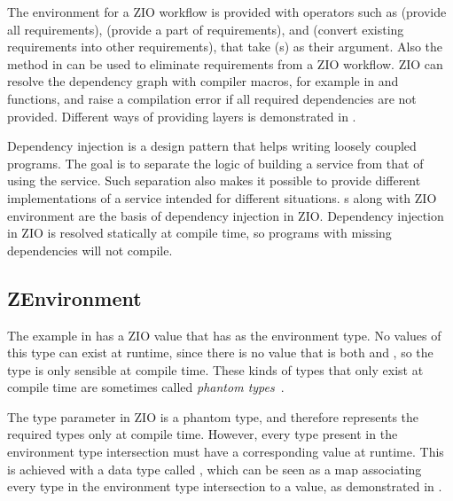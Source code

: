 

The environment for a ZIO workflow is provided with operators such as  (provide all requirements),  (provide a part of requirements), and  (convert existing requirements into other requirements), that take (s) as their argument. Also the  method in  can be used to eliminate requirements from a ZIO workflow. ZIO can resolve the dependency graph with compiler macros, for example in  and  functions, and raise a compilation error if all required dependencies are not provided. Different ways of providing layers is demonstrated in .



Dependency injection is a design pattern that helps writing loosely coupled programs. The goal is to separate the logic of building a service from that of using the service. Such separation also makes it possible to provide different implementations of a service intended for different situations. s along with ZIO environment are the basis of dependency injection in ZIO. Dependency injection in ZIO is resolved statically at compile time, so programs with missing dependencies will not compile.


\subsection{ZEnvironment}
The example in  has a ZIO value  that has  as the environment type. No values of this type can exist at runtime, since there is no value that is both  and , so the type is only sensible at compile time. These kinds of types that only exist at compile time are sometimes called \textit{phantom types}~\cite{fun-phantom-types}.

The  type parameter in ZIO is a phantom type, and therefore represents the required types only at compile time. However, every type present in the environment type intersection must have a corresponding value at runtime. This is achieved with a data type called , which can be seen as a map associating every type in the environment type intersection to a value, as demonstrated in .


